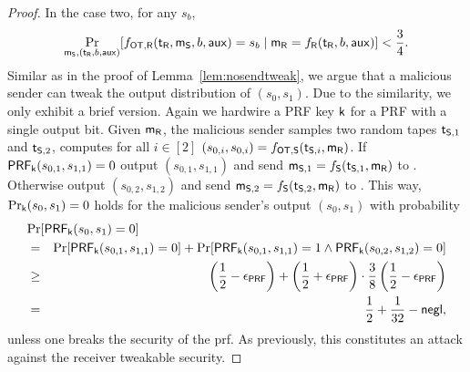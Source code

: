 \begin{proof}
In the case two, for any $s_b$,
$$
\Pr_{\mathsf{m}_{\mathsf{S}}, (\mathsf{t}_{\mathsf{R}},b,\mathsf{aux})}[f_{\mathsf{OT},\mathsf{R}}(\mathsf{t}_{\mathsf{R}},\mathsf{m}_{\mathsf{S}},b,\mathsf{aux})=s_b\mid \mathsf{m}_{\mathsf{R}}=f_{\mathsf{R}}(\mathsf{t}_{\mathsf{R}},b,\mathsf{aux})]<\frac{3}{4}.
$$
Similar as in the proof of Lemma~\ref{lem:nosendtweak}, we argue that a malicious sender can tweak the output distribution of $(s_0,s_1)$. Due to the similarity, we only exhibit a brief version. Again we hardwire a PRF key $\mathsf{k}$ for a PRF with a single output bit. Given $\mathsf{m}_{\mathsf{R}}$, the malicious sender samples two random tapes $\mathsf{t}_{\mathsf{S}, 1}$ and $\mathsf{t}_{\mathsf{S},2}$, computes for all $i\in[2]$ $(s_{0,i},s_{0,i})=f_{\mathsf{OT},\mathsf{S}}(\mathsf{t}_{\mathsf{S},i},\mathsf{m}_{\mathsf{R}})$. If $\mathsf{PRF}_{\mathsf{k}}(s_{0,1},s_{1,1})=0$ output $(s_{0,1},s_{1,1})$ and send $\mathsf{m}_{\mathsf{S},1}=f_{\mathsf{S}}(\mathsf{t}_{\mathsf{S},1},\mathsf{m}_{\mathsf{R}})$ to \rec. Otherwise output $(s_{0,2},s_{1,2})$ and send $\mathsf{m}_{\mathsf{S},2}=f_{\mathsf{S}}(\mathsf{t}_{\mathsf{S},2},\mathsf{m}_{\mathsf{R}})$ to \rec. This way, $\Pr_{\mathsf{k}}(s_0,s_1)=0$ holds for the malicious sender's output $(s_0,s_1)$ with probability 
\begin{eqnarray*}
\lefteqn{\Pr[\PRF_{\key}(s_0,s_1)=0]}\\
&=&\Pr[\PRF_{\key}(s_{0,1},s_{1,1})=0]+\Pr[\PRF_{\key}(s_{0,1},s_{1,1})=1\wedge\PRF_{\key}(s_{0,2},s_{1,2})=0]\\
&\geq&  \left(\frac{1}{2}-\epsilon_{\PRF}\right)+\left(\frac{1}{2}+\epsilon_{\PRF}\right)\cdot\frac{3}{8}\left(\frac{1}{2}-\epsilon_{\PRF}\right)\\
&=& \frac{1}{2}+\frac{1}{32}-\negl,
\end{eqnarray*}
unless one breaks the security of the prf. As previously, this constitutes an attack against the receiver tweakable security.
\end{proof}